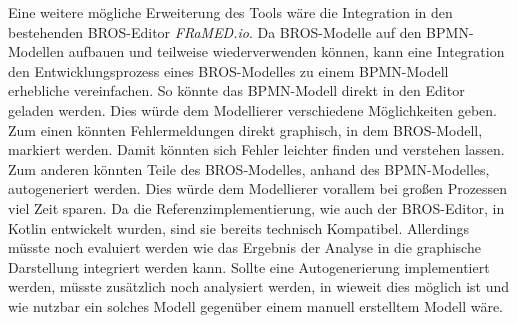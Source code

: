 Eine weitere mögliche Erweiterung des Tools wäre die Integration in den bestehenden BROS-Editor \emph{FRaMED.io}.
Da BROS-Modelle auf den BPMN-Modellen aufbauen und teilweise wiederverwenden können, kann eine Integration den Entwicklungsprozess eines BROS-Modelles zu einem BPMN-Modell erhebliche vereinfachen.
So könnte das BPMN-Modell direkt in den Editor geladen werden.
Dies würde dem Modellierer verschiedene Möglichkeiten geben.
Zum einen könnten Fehlermeldungen direkt graphisch, in dem BROS-Modell, markiert werden.
Damit könnten sich Fehler leichter finden und verstehen lassen.
Zum anderen könnten Teile des BROS-Modelles, anhand des BPMN-Modelles, autogeneriert werden.
Dies würde dem Modellierer vorallem bei großen Prozessen viel Zeit sparen.
Da die Referenzimplementierung, wie auch der BROS-Editor, in Kotlin entwickelt wurden, sind sie bereits technisch Kompatibel.
Allerdings müsste noch evaluiert werden wie das Ergebnis der Analyse in die graphische Darstellung integriert werden kann.
Sollte eine Autogenerierung implementiert werden, müsste zusätzlich noch analysiert werden, in wieweit dies möglich ist und wie nutzbar ein solches Modell gegenüber einem manuell erstelltem Modell wäre.
